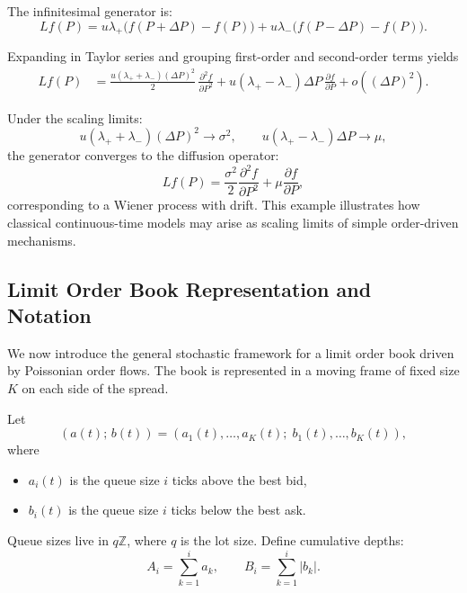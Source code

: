 The infinitesimal generator is:
\begin{equation}
Lf(P)
=
u\lambda_+ \bigl( f(P+\Delta P) - f(P) \bigr)
+
u\lambda_- \bigl( f(P-\Delta P) - f(P) \bigr).
\end{equation}

Expanding in Taylor series and grouping first-order and second-order terms yields  
\begin{align}
Lf(P)
&=
\frac{u(\lambda_+ + \lambda_-)(\Delta P)^2}{2}\,
\frac{\partial^2 f}{\partial P^2}
+
u(\lambda_+ - \lambda_-)\Delta P\,
\frac{\partial f}{\partial P}
+ o((\Delta P)^2).
\end{align}

Under the scaling limits:
\begin{equation}
u(\lambda_+ + \lambda_-)(\Delta P)^2 \to \sigma^2,
\qquad
u(\lambda_+ - \lambda_-)\Delta P \to \mu,
\end{equation}
the generator converges to the diffusion operator:  
\begin{equation}
Lf(P)
=
\frac{\sigma^2}{2}\frac{\partial^2 f}{\partial P^2}
+
\mu \frac{\partial f}{\partial P},
\end{equation}
corresponding to a Wiener process with drift.  
This example illustrates how classical continuous-time models may arise as scaling limits
of simple order-driven mechanisms.

\subsection{Limit Order Book Representation and Notation}

We now introduce the general stochastic framework for a limit order book driven by
Poissonian order flows. The book is represented in a moving frame of fixed size \(K\) on
each side of the spread.

Let
\[
(a(t);\, b(t)) =
(a_1(t),\dots,a_K(t);\; b_1(t),\dots,b_K(t)),
\]
where
\begin{itemize}
    \item \(a_i(t)\) is the queue size \(i\) ticks above the best bid,
    \item \(b_i(t)\) is the queue size \(i\) ticks below the best ask.
\end{itemize}

Queue sizes live in \(q\mathbb{Z}\), where \(q\) is the lot size.  
Define cumulative depths:
\begin{equation}
A_i = \sum_{k=1}^i a_k,
\qquad
B_i = \sum_{k=1}^i |b_k|.
\end{equation}

